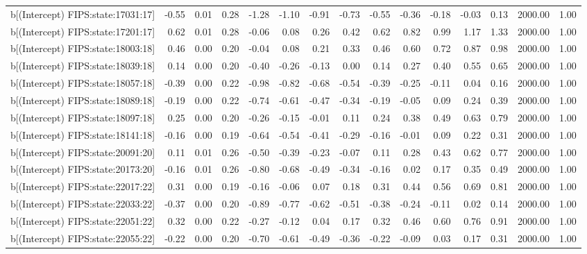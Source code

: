 \begin{table}[ht]
\begin{tabular}{rrrrrrrrrrrrrrr}
  b[(Intercept) FIPS:state:17031:17] & -0.55 & 0.01 & 0.28 & -1.28 & -1.10 & -0.91 & -0.73 & -0.55 & -0.36 & -0.18 & -0.03 & 0.13 & 2000.00 & 1.00 \\ 
  b[(Intercept) FIPS:state:17201:17] & 0.62 & 0.01 & 0.28 & -0.06 & 0.08 & 0.26 & 0.42 & 0.62 & 0.82 & 0.99 & 1.17 & 1.33 & 2000.00 & 1.00 \\ 
  b[(Intercept) FIPS:state:18003:18] & 0.46 & 0.00 & 0.20 & -0.04 & 0.08 & 0.21 & 0.33 & 0.46 & 0.60 & 0.72 & 0.87 & 0.98 & 2000.00 & 1.00 \\ 
  b[(Intercept) FIPS:state:18039:18] & 0.14 & 0.00 & 0.20 & -0.40 & -0.26 & -0.13 & 0.00 & 0.14 & 0.27 & 0.40 & 0.55 & 0.65 & 2000.00 & 1.00 \\ 
  b[(Intercept) FIPS:state:18057:18] & -0.39 & 0.00 & 0.22 & -0.98 & -0.82 & -0.68 & -0.54 & -0.39 & -0.25 & -0.11 & 0.04 & 0.16 & 2000.00 & 1.00 \\ 
  b[(Intercept) FIPS:state:18089:18] & -0.19 & 0.00 & 0.22 & -0.74 & -0.61 & -0.47 & -0.34 & -0.19 & -0.05 & 0.09 & 0.24 & 0.39 & 2000.00 & 1.00 \\ 
  b[(Intercept) FIPS:state:18097:18] & 0.25 & 0.00 & 0.20 & -0.26 & -0.15 & -0.01 & 0.11 & 0.24 & 0.38 & 0.49 & 0.63 & 0.79 & 2000.00 & 1.00 \\ 
  b[(Intercept) FIPS:state:18141:18] & -0.16 & 0.00 & 0.19 & -0.64 & -0.54 & -0.41 & -0.29 & -0.16 & -0.01 & 0.09 & 0.22 & 0.31 & 2000.00 & 1.00 \\ 
  b[(Intercept) FIPS:state:20091:20] & 0.11 & 0.01 & 0.26 & -0.50 & -0.39 & -0.23 & -0.07 & 0.11 & 0.28 & 0.43 & 0.62 & 0.77 & 2000.00 & 1.00 \\ 
  b[(Intercept) FIPS:state:20173:20] & -0.16 & 0.01 & 0.26 & -0.80 & -0.68 & -0.49 & -0.34 & -0.16 & 0.02 & 0.17 & 0.35 & 0.49 & 2000.00 & 1.00 \\ 
  b[(Intercept) FIPS:state:22017:22] & 0.31 & 0.00 & 0.19 & -0.16 & -0.06 & 0.07 & 0.18 & 0.31 & 0.44 & 0.56 & 0.69 & 0.81 & 2000.00 & 1.00 \\ 
  b[(Intercept) FIPS:state:22033:22] & -0.37 & 0.00 & 0.20 & -0.89 & -0.77 & -0.62 & -0.51 & -0.38 & -0.24 & -0.11 & 0.02 & 0.14 & 2000.00 & 1.00 \\ 
  b[(Intercept) FIPS:state:22051:22] & 0.32 & 0.00 & 0.22 & -0.27 & -0.12 & 0.04 & 0.17 & 0.32 & 0.46 & 0.60 & 0.76 & 0.91 & 2000.00 & 1.00 \\ 
  b[(Intercept) FIPS:state:22055:22] & -0.22 & 0.00 & 0.20 & -0.70 & -0.61 & -0.49 & -0.36 & -0.22 & -0.09 & 0.03 & 0.17 & 0.31 & 2000.00 & 1.00 \\ 

\end{tabular}
\end{table}
